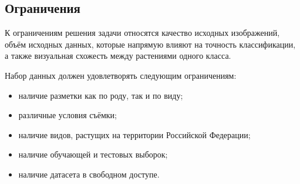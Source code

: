 \subsection{Ограничения}
К ограничениям решения задачи относятся качество исходных изображений, объём исходных данных, которые напрямую влияют на точность классификации, а также визуальная схожесть между растениями одного класса.

Набор данных должен удовлетворять следующим ограничениям:
\begin{itemize}[label=---, itemsep=0pt, parsep=0pt, topsep=0pt]
	\item наличие разметки как по роду, так и по виду;
	\item различные условия съёмки;
	\item наличие видов, растущих на территории Российской Федерации;
	\item наличие обучающей и тестовых выборок;
	\item наличие датасета в свободном доступе.
\end{itemize}

